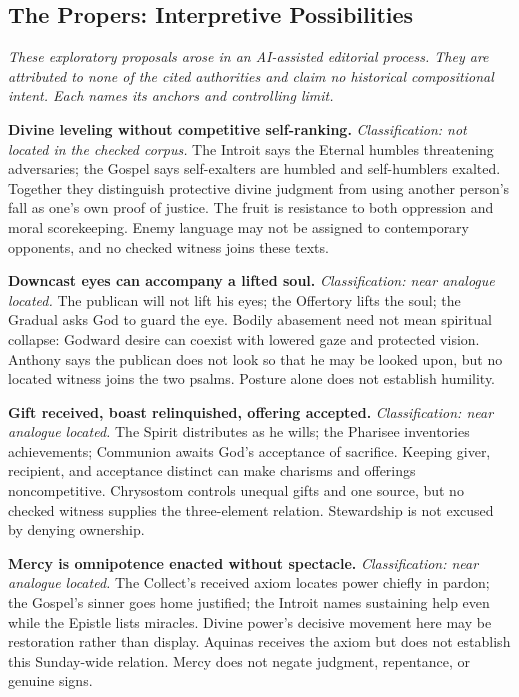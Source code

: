 \begin{deepstudy}
\sectionguard
\section*{The Propers: Interpretive Possibilities}

\noindent\emph{These exploratory proposals arose in an AI-assisted editorial process. They are attributed to none of the cited authorities and claim no historical compositional intent. Each names its anchors and controlling limit.}

\noindent\textbf{Divine leveling without competitive self-ranking.\enspace{}}
\emph{Classification: not located in the checked corpus.} The Introit says the Eternal humbles threatening adversaries; the Gospel says self-exalters are humbled and self-humblers exalted. Together they distinguish protective divine judgment from using another person's fall as one's own proof of justice. The fruit is resistance to both oppression and moral scorekeeping. Enemy language may not be assigned to contemporary opponents, and no checked witness joins these texts.

\noindent\textbf{Downcast eyes can accompany a lifted soul.\enspace{}}
\emph{Classification: near analogue located.} The publican will not lift his eyes; the Offertory lifts the soul; the Gradual asks God to guard the eye. Bodily abasement need not mean spiritual collapse: Godward desire can coexist with lowered gaze and protected vision. Anthony says the publican does not look so that he may be looked upon, but no located witness joins the two psalms. Posture alone does not establish humility.

\noindent\textbf{Gift received, boast relinquished, offering accepted.\enspace{}}
\emph{Classification: near analogue located.} The Spirit distributes as he wills; the Pharisee inventories achievements; Communion awaits God's acceptance of sacrifice. Keeping giver, recipient, and acceptance distinct can make charisms and offerings noncompetitive. Chrysostom controls unequal gifts and one source, but no checked witness supplies the three-element relation. Stewardship is not excused by denying ownership.

\noindent\textbf{Mercy is omnipotence enacted without spectacle.\enspace{}}
\emph{Classification: near analogue located.} The Collect's received axiom locates power chiefly in pardon; the Gospel's sinner goes home justified; the Introit names sustaining help even while the Epistle lists miracles. Divine power's decisive movement here may be restoration rather than display. Aquinas receives the axiom but does not establish this Sunday-wide relation. Mercy does not negate judgment, repentance, or genuine signs.


\end{deepstudy}
